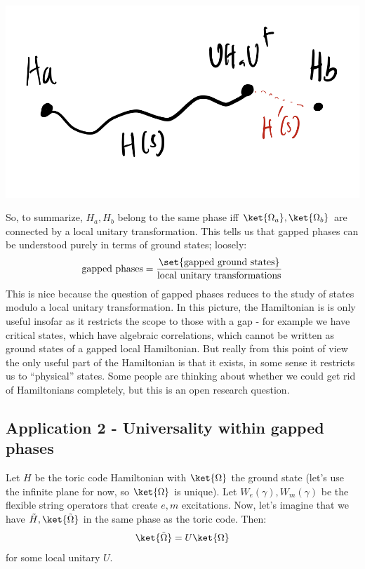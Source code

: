 \begin{enumerate}
\begin{enumerate}[(a)]
\begin{center}
            \includegraphics[scale=0.35]{Lectures/Images/lec12-connectingH.png}
        \end{center}
    \end{enumerate}
\end{enumerate}

So, to summarize, $H_a, H_b$ belong to the same phase iff $\ket{\Omega_a}, \ket{\Omega_b}$ are connected by a local unitary transformation. This tells us that gapped phases can be understood purely in terms of ground states; loosely:
\begin{equation}
    \text{gapped phases} = \frac{\set{\text{gapped ground states}}}{\text{local unitary transformations}}
\end{equation}
This is nice because the question of gapped phases reduces to the study of states modulo a local unitary transformation. In this picture, the Hamiltonian is is only useful insofar as it restricts the scope to those with a gap - for example we have critical states, which have algebraic correlations, which cannot be written as ground states of a gapped local Hamiltonian. But really from this point of view the only useful part of the Hamiltonian is that it exists, in some sense it restricts us to ``physical'' states. Some people are thinking about whether we could get rid of Hamiltonians completely, but this is an open research question.

\subsection{Application 2 - Universality within gapped phases}
Let $H$ be the toric code Hamiltonian with $\ket{\Omega}$ the ground state (let's use the infinite plane for now, so $\ket{\Omega}$ is unique). Let $W_e(\gamma), W_m(\gamma)$ be the flexible string operators that create $e, m$ excitations. Now, let's imagine that we have $\tilde{H}, \ket{\tilde{\Omega}}$ in the same phase as the toric code. Then:
\begin{equation}
    \ket{\tilde{\Omega}} = U\ket{\Omega}
\end{equation}
for some local unitary $U$.

